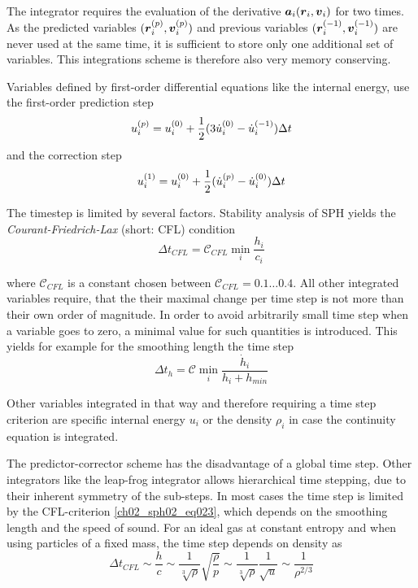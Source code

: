 The integrator requires the evaluation of the derivative $\boldsymbol{a}_i( \boldsymbol{r}_i, \boldsymbol{v}_i)$ for two times. As the predicted variables $(\boldsymbol{r}_i^{(p)}, \boldsymbol{v}_i^{(p)})$ and previous variables $(\boldsymbol{r}_i^{(-1)}, \boldsymbol{v}_i^{(-1)})$ are never used at the same time, it is sufficient to store only one additional set of variables. This integrations scheme is therefore also very memory conserving.

Variables defined by first-order differential equations like the internal energy, use the first-order prediction step
\begin{equation}
\label{ch02_sph02_eq021}
u_i^{(p)} = u_i^{(0)} + \frac{1}{2} ( 3 \dot{u}_i^{(0)} - \dot{u}_i^{(-1)} )\Delta t \\
\end{equation}
and the correction step
\begin{equation}
\label{ch02_sph02_eq022}
u_i^{(1)} = u_i^{(0)} + \frac{1}{2} ( \dot{u}_i^{(p)} - \dot{u}_i^{(0)} )\Delta t \\
\end{equation}

The timestep is limited by several factors. Stability analysis of SPH yields the \emph{Courant-Friedrich-Lax} (short: CFL) condition 
\begin{equation}
\label{ch02_sph02_eq023}
\Delta t_{CFL} = \mathcal{C}_{CFL} \min_{i} \frac{h_i}{c_i}
\end{equation}

where $\mathcal{C}_{CFL}$ is a constant chosen between $\mathcal{C}_{CFL} = 0.1 \dots 0.4$. All other integrated variables require, that the their maximal change per time step is not more than their own order of magnitude. In order to avoid arbitrarily small time step when a variable goes to zero, a minimal value for such quantities is introduced. This yields for example for the smoothing length the time step
\begin{equation}
\label{ch02_sph02_eq024}
\Delta t_{h} = \mathcal{C} \min_{i} \frac{\dot{h}_i}{h_i + h_{min}}
\end{equation}

Other variables integrated in that way and therefore requiring a time step criterion are specific internal energy $u_i$ or the density $\rho_i$ in case the continuity equation is integrated. 

The predictor-corrector scheme has the disadvantage of a global time step. Other integrators like the leap-frog integrator allows hierarchical time stepping, due to their inherent symmetry of the sub-steps. In most cases the time step is limited by the CFL-criterion \ref{ch02_sph02_eq023}, which depends on the smoothing length and the speed of sound. For an ideal gas at constant entropy and when using particles of a fixed mass, the time step depends on density as 
\begin{equation}
\label{ch02_sph02_eq025}
\Delta t_{CFL} \sim \frac{h}{c} \sim \frac{1}{\sqrt[3]{\rho}} \sqrt{ \frac{\rho}{p} } \sim \frac{1}{\sqrt[3]{\rho}} \frac{1}{\sqrt{u}} \sim \frac{1}{\rho^{2/3}}
\end{equation}

